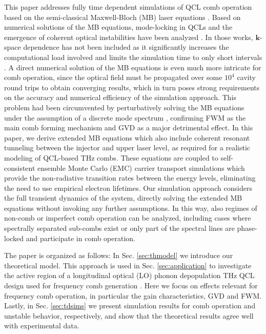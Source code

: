 \documentclass[10pt]{article}
\def\bm{\mathbf}
\begin{document}
	This paper addresses fully time dependent simulations of QCL comb operation
	based on the semi-classical Maxwell-Bloch (MB) laser equations
	\cite{boyd2003nonlinear}. Based on numerical solutions of the MB equations,
	mode-locking in QCLs and the emergence of coherent optical instabilities have
	been analyzed
	\cite{wang2007coherent,gordon2008multimode,gkortsas2010dynamics,talukder2010self,wang2015active,vukovic2016multimode}.
	In those works, $\bm{k}$-space dependence has not been included as it significantly increases the computational load involved 
	and limits the simulation time to only short intervals \cite{weber2006theory}. 
	A direct numerical solution of the MB equations is even much more intricate for
	comb operation, since the optical field must be propagated over some $10^{4}$
	cavity round trips to obtain converging results, which in turn poses strong
	requirements on the accuracy and numerical efficiency of the simulation
	approach. This problem had been circumvented by perturbatively solving the MB
	equations under the assumption of a discrete mode spectrum
	\cite{khurgin2014coherent,villares2015quantum}, confirming FWM as the main
	comb forming mechanism and GVD as a major detrimental effect. In this paper,
	we derive extended MB equations which also include coherent resonant tunneling
	between the injector and upper laser level, as required for a realistic
	modeling of QCL-based THz combs. These equations are coupled to
	self-consistent ensemble Monte Carlo (EMC) carrier transport simulations which
	provide the non-radiative transition rates between the energy levels,
	eliminating the need to use empirical electron lifetimes. Our simulation
	approach considers the full transient dynamics of the system, directly solving
	the extended MB equations without invoking any further assumptions. In this
	way, also regimes of non-comb or imperfect comb operation can be analyzed,
	including cases where spectrally separated sub-combs exist or only part of the
	spectral lines are phase-locked and participate in comb operation.
	
	The paper is organized as follows: In Sec. \ref{sec:thmodel} we introduce our
	theoretical model. This approach is used in Sec. \ref{sec:application} to
	investigate the active region of a longitudinal optical (LO) phonon
	depopulation THz QCL design used for frequency comb generation
	\cite{burghoff2014terahertz}. Here we focus on effects relevant for frequency
	comb operation, in particular the gain characteristics, GVD and FWM. Lastly,
	in Sec. \ref{sec:tdsims} we present simulation results for comb
	operation and unstable behavior, respectively, and show that the theoretical
	results agree well with experimental data.
	
\end{document}
